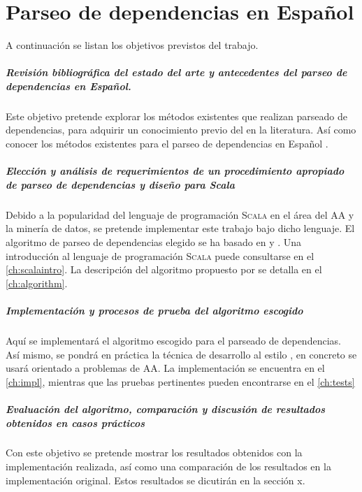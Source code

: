 \chapter{Parseo de dependencias en Español}\label{ch:depparsing}

A continuación se listan los objetivos previstos del trabajo.

\paragraph{Revisión bibliográfica del estado del arte y antecedentes del parseo
  de dependencias en Español.} Este objetivo pretende explorar los métodos
existentes que realizan parseado de dependencias, para adquirir un conocimiento
previo del  en la literatura. Así como conocer los
métodos existentes para el parseo de dependencias en Español
\cite{ballesteros2016}.

\paragraph{Elección y análisis de requerimientos de un procedimiento apropiado de
  parseo de dependencias y diseño para Scala}
Debido a la popularidad del lenguaje de programación \textsc{Scala} en el área
del \ac{AA} y la minería de datos, se pretende implementar este trabajo bajo
dicho lenguaje. El algoritmo de parseo de dependencias elegido se ha basado en
\citeauthor{yamada2003} \cite{yamada2003} y \citeauthor{rohit2016}
\cite{rohit2016}. Una introducción al lenguaje de programación \textsc{Scala}
puede consultarse en el \autoref{ch:scalaintro}. La descripción del algoritmo
propuesto por \citeauthor{yamada2003} se detalla en el \autoref{ch:algorithm}.

\paragraph{Implementación y procesos de prueba del algoritmo escogido}
Aquí se implementará el algoritmo escogido para el parseado de dependencias. Así
mismo, se pondrá en práctica la técnica de desarrollo al estilo
, en concreto se usará  orientado a
problemas de \ac{AA}. La implementación se encuentra en el \autoref{ch:impl},
mientras que las pruebas pertinentes pueden encontrarse en el \autoref{ch:tests}

\paragraph{Evaluación del algoritmo, comparación y discusión de resultados
  obtenidos en casos prácticos}
Con este objetivo se pretende mostrar los resultados obtenidos con la
implementación realizada, así como una comparación de los resultados en la
implementación original. Estos resultados se dicutirán en la sección x.

